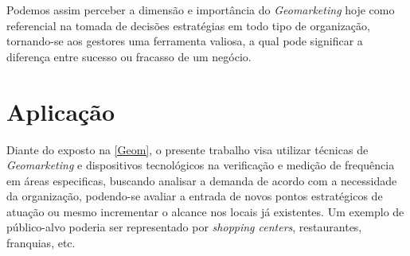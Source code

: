 Podemos assim perceber a dimensão e importância do \emph{Geomarketing} hoje como referencial na tomada de decisões estratégias em todo tipo de organização, tornando-se aos gestores uma ferramenta valiosa,  a qual pode significar a diferença entre sucesso ou fracasso de um negócio. 

\section{Aplicação}
Diante do exposto na \autoref{Geom}, o presente trabalho visa utilizar técnicas de \emph{Geomarketing} e dispositivos tecnológicos na verificação e medição de frequência em áreas especificas, buscando analisar a demanda de acordo com a necessidade da organização, podendo-se avaliar a entrada de novos pontos estratégicos de atuação ou mesmo incrementar o alcance nos locais já existentes. Um exemplo de público-alvo poderia ser representado por \emph{shopping centers}, restaurantes, franquias, etc.  
